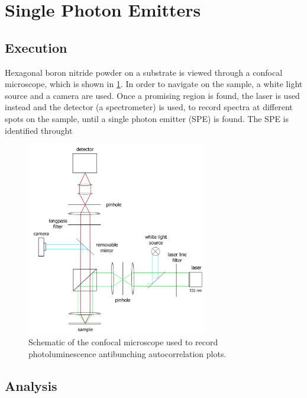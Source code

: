 \section{Single Photon Emitters}
\label{sec:SPE}

\subsection{Execution}

Hexagonal boron nitride powder on a substrate is viewed through a confocal microscope, which is shown in \cref{fig_confocal}.
In order to navigate on the sample, a white light source and a camera are used.
Once a promising region is found, the laser is used instead and the detector (a spectrometer) is used, to record spectra at different spots on the sample, until a single photon emitter (SPE) is found.
The SPE is identified throught %


\begin{figure}[!ht]
    \centering
    \includegraphics[width=0.7\textwidth]{img/setup2.png}
    \caption{Schematic of the confocal microscope used to record photoluminescence antibunching autocorrelation plots.}
    \label{fig_confocal}
\end{figure}

\subsection{Analysis}
